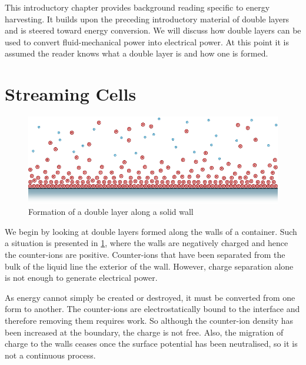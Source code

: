 
This introductory chapter provides background reading specific to energy harvesting.
It builds upon the preceding introductory material of double layers and is steered toward energy conversion.
We will discuss how double layers can be used to convert fluid-mechanical power into electrical power.
At this point it is assumed the reader knows what a double layer is and how one is formed.

\section{Streaming Cells}
  \begin{figure}
      \centering
      \includegraphics{content/pt1/01-PowerHarvesting/graphics/intro_2_wall}
      \caption{\label{fig:doubleLayerBetweenWalls}Formation of a double layer along a solid wall}
  \end{figure}

  We begin by looking at double layers formed along the walls of a container.
  Such a situation is presented in \ref{fig:doubleLayerBetweenWalls}, where the walls are negatively charged and hence the counter-ions are positive.
  Counter-ions that have been separated from the bulk of the liquid line the exterior of the wall.
  However, charge separation alone is not enough to generate electrical power.

  As energy cannot simply be created or destroyed, it must be converted from one form to another.
  The counter-ions are electrostatically bound to the interface and therefore removing them requires work.
  So although the counter-ion density has been increased at the boundary, the charge is not free.
  Also, the migration of charge to the walls ceases once the surface potential has been neutralised, so it is not a continuous process.

